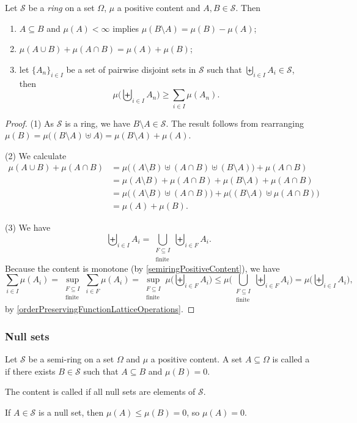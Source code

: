 \begin{proposition} \label{ringPositiveContent}
Let $\mathcal{S}$ be a \emph{ring} on a set $\Omega$, $\mu$ a positive content and $A,B\in \mathcal{S}$. Then
\begin{enumerate}
\item $A\subseteq B$ and $\mu(A)<\infty$ implies $\mu(B\setminus A) = \mu(B) - \mu(A)$;
\item $\mu(A \cup B) + \mu(A\cap B) = \mu(A) + \mu(B)$;
\item let $\{A_n\}_{i\in I}$ be a set of pairwise disjoint sets in $\mathcal{S}$ such that $\biguplus_{i\in I}A_i \in \mathcal{S}$, then
\[ \mu\Big(\biguplus_{i\in I}A_n\Big) \geq \sum_{i\in I}\mu(A_n). \]
\end{enumerate}
\end{proposition}
\begin{proof}
(1) As $\mathcal{S}$ is a ring, we have $B\setminus A\in\mathcal{S}$. The result follows from rearranging $\mu(B) = \mu\big((B\setminus A) \uplus A\big) = \mu(B\setminus A) + \mu(A)$.

(2) We calculate
\begin{align*}
\mu(A \cup B) + \mu(A\cap B) &= \mu\big((A\setminus B)\uplus (A\cap B) \uplus (B\setminus A)\big) + \mu(A\cap B) \\
&= \mu(A\setminus B) + \mu(A\cap B) + \mu(B\setminus A) + \mu(A\cap B) \\
&= \mu\big((A\setminus B) \uplus (A\cap B)\big) + \mu\big((B\setminus A) \uplus \mu(A\cap B)\big) \\
&= \mu(A) + \mu(B).
\end{align*}

(3) We have
\[ \biguplus_{i\in I} A_i = \bigcup_{\substack{F\subseteq I \\ \text{finite}}}\biguplus_{i\in F}A_i. \]
Because the content is monotone (by \ref{semiringPositiveContent}), we have
\[ \sum_{i\in I}\mu(A_i) = \sup_{\substack{F\subseteq I \\ \text{finite}}}\sum_{i\in F}\mu(A_i) = \sup_{\substack{F\subseteq I \\ \text{finite}}}\mu\Big(\biguplus_{i\in F}A_i\Big) \leq \mu\Big(\bigcup_{\substack{F\subseteq I \\ \text{finite}}}\biguplus_{i\in F}A_i\Big) = \mu\Big(\biguplus_{i\in I} A_i\Big), \]
by \ref{orderPreservingFunctionLatticeOperations}.
\end{proof}

\subsubsection{Null sets}
\begin{definition}
Let $\mathcal{S}$ be a semi-ring on a set $\Omega$ and $\mu$ a positive content. A set $A\subseteq \Omega$ is called a  if there exists $B\in \mathcal{S}$ such that $A\subseteq B$ and $\mu(B) = 0$.

The content is called  if all null sets are elements of $\mathcal{S}$.
\end{definition}
If $A\in\mathcal{S}$ is a null set, then $\mu(A) \leq \mu(B) = 0$, so $\mu(A) = 0$.

